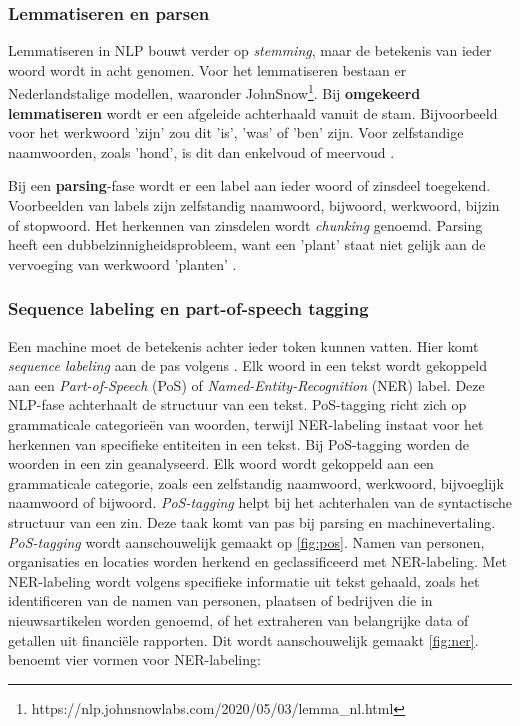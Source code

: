 \subsubsection{Lemmatiseren en parsen}

Lemmatiseren in NLP bouwt verder op \textit{stemming}, maar de betekenis van ieder woord wordt in acht genomen. Voor het lemmatiseren bestaan er Nederlandstalige modellen, waaronder JohnSnow\footnote{https://nlp.johnsnowlabs.com/2020/05/03/lemma\_nl.html}. Bij \textbf{omgekeerd lemmatiseren} wordt er een afgeleide achterhaald vanuit de stam. Bijvoorbeeld voor het werkwoord 'zijn' zou dit 'is', 'was' of 'ben' zijn. Voor zelfstandige naamwoorden, zoals 'hond', is dit dan enkelvoud of meervoud \autocite{Eisenstein2019}.

Bij een \textbf{parsing}-fase wordt er een label aan ieder woord of zinsdeel toegekend. Voorbeelden van labels zijn zelfstandig naamwoord, bijwoord, werkwoord, bijzin of stopwoord. Het herkennen van zinsdelen wordt \textit{chunking} genoemd. Parsing heeft een dubbelzinnigheidsprobleem, want een 'plant' staat niet gelijk aan de vervoeging van werkwoord 'planten' \autocite{Eisenstein2019}.


\subsubsection{Sequence labeling en part-of-speech tagging}

Een machine moet de betekenis achter ieder token kunnen vatten. Hier komt \textit{sequence labeling} aan de pas volgens \textcite{Eisenstein2019}. Elk woord in een tekst wordt gekoppeld aan een \textit{Part-of-Speech} (PoS) of \textit{Named-Entity-Recognition} (NER) label. Deze NLP-fase achterhaalt de structuur van een tekst. PoS-tagging richt zich op grammaticale categorieën van woorden, terwijl NER-labeling instaat voor het herkennen van specifieke entiteiten in een tekst. Bij PoS-tagging worden de woorden in een zin geanalyseerd. Elk woord wordt gekoppeld aan een grammaticale categorie, zoals een zelfstandig naamwoord, werkwoord, bijvoeglijk naamwoord of bijwoord. \textit{PoS-tagging} helpt bij het achterhalen van de syntactische structuur van een zin. Deze taak komt van pas bij parsing en machinevertaling. \textit{PoS-tagging} wordt aanschouwelijk gemaakt op \ref{fig:pos}. Namen van personen, organisaties en locaties worden herkend en geclassificeerd met NER-labeling. Met NER-labeling wordt volgens \textcite{Jurafsky2014} specifieke informatie uit tekst gehaald, zoals het identificeren van de namen van personen, plaatsen of bedrijven die in nieuwsartikelen worden genoemd, of het extraheren van belangrijke data of getallen uit financiële rapporten. Dit wordt aanschouwelijk gemaakt \ref{fig:ner}. \textcite{Li2018} benoemt vier vormen voor NER-labeling:


